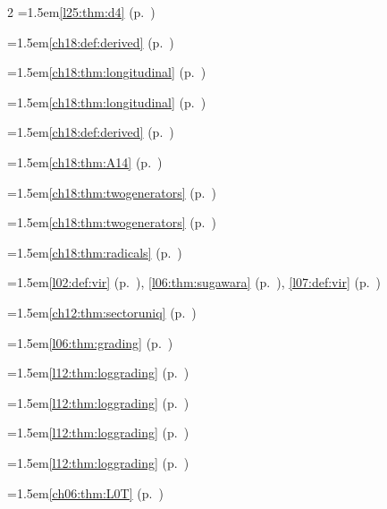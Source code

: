 \begin{multicols}{2}
\hangindent=1.5em\quad \ref{l25:thm:d4} (p.~\pageref{l25:thm:d4})\par
\hangindent=1.5em\quad \ref{ch18:def:derived} (p.~\pageref{ch18:def:derived})\par
\hangindent=1.5em\quad \ref{ch18:thm:longitudinal} (p.~\pageref{ch18:thm:longitudinal})\par
\hangindent=1.5em\quad \ref{ch18:thm:longitudinal} (p.~\pageref{ch18:thm:longitudinal})\par
\hangindent=1.5em\quad \ref{ch18:def:derived} (p.~\pageref{ch18:def:derived})\par
\hangindent=1.5em\quad \ref{ch18:thm:A14} (p.~\pageref{ch18:thm:A14})\par
\hangindent=1.5em\quad \ref{ch18:thm:twogenerators} (p.~\pageref{ch18:thm:twogenerators})\par
\hangindent=1.5em\quad \ref{ch18:thm:twogenerators} (p.~\pageref{ch18:thm:twogenerators})\par
\hangindent=1.5em\quad \ref{ch18:thm:radicals} (p.~\pageref{ch18:thm:radicals})\par
\par{}\par\nopagebreak\smallskip
\hangindent=1.5em\quad \ref{l02:def:vir} (p.~\pageref{l02:def:vir}), \ref{l06:thm:sugawara} (p.~\pageref{l06:thm:sugawara}), \ref{l07:def:vir} (p.~\pageref{l07:def:vir})\par
\hangindent=1.5em\quad \ref{ch12:thm:sectoruniq} (p.~\pageref{ch12:thm:sectoruniq})\par
\hangindent=1.5em\quad \ref{l06:thm:grading} (p.~\pageref{l06:thm:grading})\par
\hangindent=1.5em\quad \ref{l12:thm:loggrading} (p.~\pageref{l12:thm:loggrading})\par
\hangindent=1.5em\quad \ref{l12:thm:loggrading} (p.~\pageref{l12:thm:loggrading})\par
\hangindent=1.5em\quad \ref{l12:thm:loggrading} (p.~\pageref{l12:thm:loggrading})\par
\hangindent=1.5em\quad \ref{l12:thm:loggrading} (p.~\pageref{l12:thm:loggrading})\par
\hangindent=1.5em\quad \ref{ch06:thm:L0T} (p.~\pageref{ch06:thm:L0T})\par

\end{multicols}
